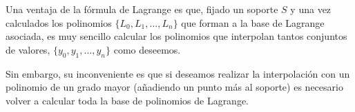 \begin{remark}
  Una ventaja de la fórmula de Lagrange es que, fijado un soporte $S$
  y una vez calculados los polinomios $\{L_0,L_1,\dots, L_n\}$ que
  forman a la base de Lagrange asociada, es muy sencillo calcular los
  polinomios que interpolan tantos conjuntos de valores,
  $\{y_0,y_1,\dots,y_n\}$ como deseemos.

  Sin embargo, su inconveniente es que si deseamos realizar la
  interpolación con un polinomio de un grado mayor (añadiendo un punto
  más al soporte) es necesario volver a calcular toda la base de
  polinomios de Lagrange.
\end{remark}



